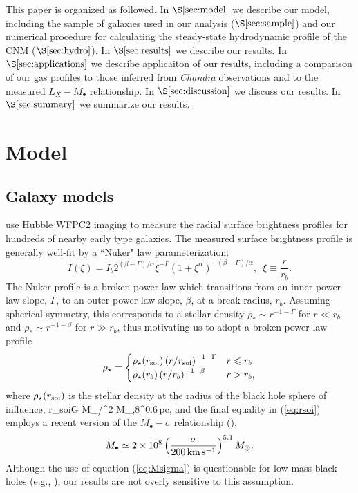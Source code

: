 \documentclass[usenatbib,fleqn]{mn2e}
\newcommand{\rb}{r_b}
\newcommand{\rhostar}{\rho_*}
\newcommand{\Mbh}[1][]{M_{\bullet#1}}
\newcommand{\soi}{\rm soi}
\newcommand{\rsoi}{r_{\soi}}
\begin{document}
This paper is organized as followed.  In $\S\ref{sec:model}$ we
describe our model, including the sample of galaxies used in our
analysis ($\S\ref{sec:sample}$) and our numerical procedure for
calculating the steady-state hydrodynamic profile of the CNM
($\S\ref{sec:hydro}$).  In $\S\ref{sec:results}$ we describe our
results.  In $\S\ref{sec:applications}$ we describe applicaiton of our
results, including a comparison of our gas profiles to those inferred
from {\it Chandra} observations and to the measured $L_X-\Mbh$
relationship.  In $\S\ref{sec:discussion}$ we discuss our results.  In
$\S\ref{sec:summary}$ we summarize our results.
\section{Model}
\label{sec:model}
\subsection{Galaxy models}
\citet{LauerFaber+:2007a} use Hubble WFPC2 imaging to measure the
radial surface brightness profiles for hundreds of nearby early type galaxies. The measured surface brightness profile is generally well-fit by a ``Nuker" law parameterization:
\begin{equation}
  I(\xi)=I_b 2^{(\beta-\Gamma)/\alpha} \xi^{-\Gamma} (1+\xi^\alpha)^{-(\beta-\Gamma)/\alpha}, \,\,\,\xi\equiv\frac{r}{r_b}.
\end{equation}
The Nuker profile is a broken power law which transitions from an inner power law slope, $\Gamma$, to an outer power law slope, $\beta$, at a break radius, $\rb$.  Assuming spherical symmetry, this corresponds to a stellar density $\rhostar \sim r^{-1-\Gamma}$ for $r \ll \rb$ and $\rhostar\sim r^{-1-\beta}$ for $r \gg \rb$, thus motivating us to adopt a broken power-law profile
\begin{align}
\rho_\star = 
\begin{cases}
\rho_\star(\rsoi) \left(r/\rsoi\right)^{-1-\Gamma} & r \leq r_b\\
\rho_\star(r_b) \left(r/r_b\right)^{-1-\beta} & r > r_b,
\label{eq:rhostar}
\end{cases}
\end{align}
where $\rho_\star(\rsoi)$ is the stellar density at the radius of the black hole sphere of influence, 
\be
\rsoi \simeq G \Mbh/\sigma^2  M_{\bullet,8}^{0.6}\,{\rm pc},
\label{eq:rsoi}
\ee
and the final equality in (\ref{eq:rsoi}) employs a recent version of the $\Mbh-\sigma$ relationship (\citealt{Gultekin+09}),
 \begin{align}
M_{\bullet} \simeq 2\times 10^{8}\left(\frac{\sigma}{200\,{\rm
      km\,s^{-1}}}\right)^{5.1}M_{\odot}.
\label{eq:Msigma}
\end{align}
Although the use of equation (\ref{eq:Msigma}) is questionable for low mass black holes (e.g., \citealt{Greene&Ho07}), our results are not overly sensitive to this assumption.  
\end{document}
